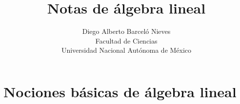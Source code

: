 \documentclass[12pt,libertine]{book}
\begin{document}
\title{Notas de álgebra lineal}
\author{Diego Alberto Barceló Nieves\\  Facultad de Ciencias \\ Universidad Nacional Autónoma de México}
\date{}%
\maketitle

\tableofcontents

%

\newpage


\newpage
\chapter{Nociones básicas de álgebra lineal}\label{Chap: Nociones básicas de álgebra lineal}
\setcounter{section}{0}


%
%
%
%
%

%
%
%
%
%
%
%
%
%
%
%
%
%
%
%
%
%
%
%
%
%
%
%
%
%
%
%
\end{document}
